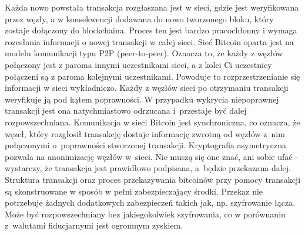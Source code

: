\documentclass[12pt, twoside, final, openany]{mgr}
\begin{document}
\indent Każda nowo powstała transakcja rozgłaszana jest w sieci, gdzie jest weryfikowana przez węzły, a w konsekwencji dodawana do nowo tworzonego bloku, który zostaje dołączony do blockchaina. Proces ten jest bardzo pracochłonny i wymaga rozesłania informacji o nowej transakcji w całej sieci. Sieć Bitcoin oparta jest na modelu komunikacji typu P2P (peer-to-peer). Oznacza to, że każdy z węzłów połączony jest z paroma innymi uczestnikami sieci, a z kolei Ci uczestnicy połączeni są z paroma kolejnymi uczestnikami. Powoduje to rozprzestrzenianie się informacji w sieci wykładniczo. Każdy z węzłów sieci po otrzymaniu transakcji weryfikuje ją pod kątem poprawności. W przypadku wykrycia niepoprawnej transakcji jest ona natychmiastowo odrzucana i~przestaje być dalej rozpowszechniana. Komunikacja w sieci Bitcoin jest synchroniczna, co oznacza, że węzeł, który rozgłosił transakcję dostaje informację zwrotną od węzłów z~nim połączonymi o~poprawności stworzonej transakcji. Kryptografia asymetryczna pozwala na anonimizację węzłów w~sieci. Nie muszą się one znać, ani sobie ufać - wystarczy, że transakcja jest prawidłowo podpisana, a~będzie przekazana dalej. Struktura transakcji oraz proces przekazywania bitcoinów przy pomocy transakcji są skonstruowane w sposób w pełni zabezpieczający środki. Przekaz nie potrzebuje żadnych dodatkowych zabezpieczeń takich jak, np. szyfrowanie łącza. Może być rozpowszechniany bez jakiegokolwiek szyfrowania, co w porównaniu z~walutami fiducjarnymi jest ogromnym zyskiem\cite{Mastering}.
\end{document}

